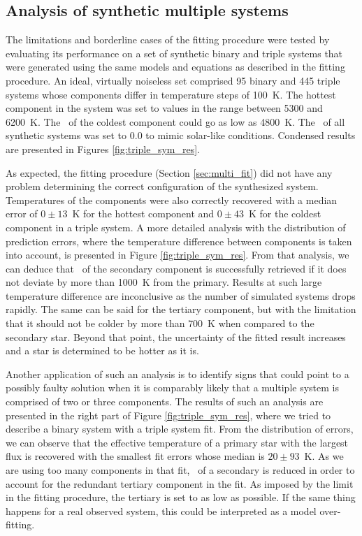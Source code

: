 \subsection{Analysis of synthetic multiple systems}
The limitations and borderline cases of the fitting procedure were tested by evaluating its performance on a set of synthetic binary and triple systems that were generated using the same models and equations as described in the fitting procedure. An ideal, virtually noiseless set comprised 95 binary and 445 triple systems whose components differ in temperature steps of 100~K. The hottest component in the system was set to values in the range between 5300 and 6200~K. The \Teff\ of the coldest component could go as low as 4800~K. The \Feh\ of all synthetic systems was set to $0.0$ to mimic solar-like conditions. Condensed results are presented in Figures \ref{fig:triple_sym_res}.

As expected, the fitting procedure (Section \ref{sec:multi_fit}) did not have any problem determining the correct configuration of the synthesized system. Temperatures of the components were also correctly recovered with a median error of $0 \pm 13$~K for the hottest component and  $0 \pm 43$~K for the coldest component in a triple system. A more detailed analysis with the distribution of prediction errors, where the temperature difference between components is taken into account, is presented in Figure \ref{fig:triple_sym_res}. From that analysis, we can deduce that \Teff\ of the secondary component is successfully retrieved if it does not deviate by more than 1000~K from the primary. Results at such large temperature difference are inconclusive as the number of simulated systems drops rapidly. The same can be said for the tertiary component, but with the limitation that it should not be colder by more than $700$~K when compared to the secondary star. Beyond that point, the uncertainty of the fitted result increases and a star is determined to be hotter as it is.

Another application of such an analysis is to identify signs that could point to a possibly faulty solution when it is comparably likely that a multiple system is comprised of two or three components. The results of such an analysis are presented in the right part of Figure \ref{fig:triple_sym_res}, where we tried to describe a binary system with a triple system fit. From the distribution of errors, we can observe that the effective temperature of a primary star with the largest flux is recovered with the smallest fit errors whose median is $20 \pm 93$~K. As we are using too many components in that fit, \Teff\ of a secondary is reduced in order to account for the redundant tertiary component in the fit. As imposed by the limit in the fitting procedure, the tertiary  is set to as low as possible. If the same thing happens for a real observed system, this could be interpreted as a model over-fitting.

